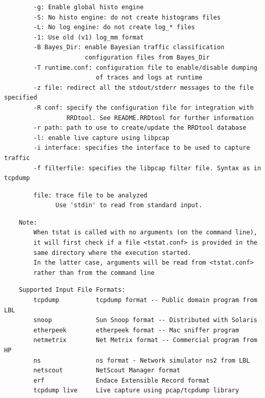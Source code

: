 \documentclass[11pt]{article}
\begin{document}
\begin{small}\begin{verbatim}
        -g: Enable global histo engine
        -S: No histo engine: do not create histograms files 
        -L: No log engine: do not create log_* files 
        -1: Use old (v1) log_mm format
        -B Bayes_Dir: enable Bayesian traffic classification
                      configuration files from Bayes_Dir
        -T runtime.conf: configuration file to enable/disable dumping
                         of traces and logs at runtime
        -z file: redirect all the stdout/stderr messages to the file specified
        -R conf: specify the configuration file for integration with
                 RRDtool. See README.RRDtool for further information
        -r path: path to use to create/update the RRDtool database
        -l: enable live capture using libpcap
        -i interface: specifies the interface to be used to capture traffic
        -f filterfile: specifies the libpcap filter file. Syntax as in tcpdump
\end{verbatim}\end{small} \noindent
\begin{small}\begin{verbatim}
        file: trace file to be analyzed
              Use 'stdin' to read from standard input.
\end{verbatim}\end{small} \noindent
\begin{small}\begin{verbatim}
    Note:
        When tstat is called with no arguments (on the command line),
        it will first check if a file <tstat.conf> is provided in the
        same directory where the execution started.
        In the latter case, arguments will be read from <tstat.conf>
        rather than from the command line
\end{verbatim}\end{small} \noindent
\begin{small}\begin{verbatim}
    Supported Input File Formats:
        tcpdump          tcpdump format -- Public domain program from LBL
        snoop            Sun Snoop format -- Distributed with Solaris
        etherpeek        etherpeek format -- Mac sniffer program
        netmetrix        Net Metrix format -- Commercial program from HP
        ns               ns format - Network simulator ns2 from LBL
        netscout         NetScout Manager format
        erf              Endace Extensible Record format
        tcpdump live     Live capture using pcap/tcpdump library
\end{verbatim}\end{small} \noindent
\end{document}

